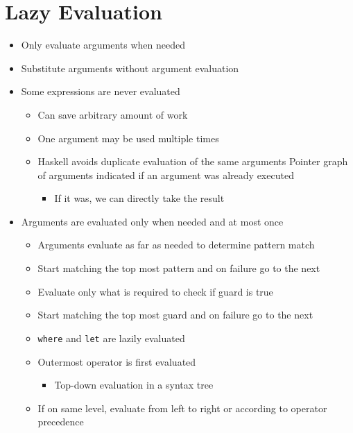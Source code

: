 
\section{Lazy Evaluation}
\begin{itemize}
    \item Only evaluate arguments when needed
    \item Substitute arguments without argument evaluation
    \item Some expressions are never evaluated
        \begin{itemize}
            \item Can save arbitrary amount of work
        \end{itemize}
        \begin{itemize}
            \item One argument may be used multiple times
            \item Haskell avoids duplicate evaluation of the same arguments
             Pointer graph of arguments indicated if an argument was already executed
                \begin{itemize}
                    \item If it was, we can directly take the result
                \end{itemize}
        \end{itemize}
    \item Arguments are evaluated only when needed and at most once
        \begin{itemize}
            \item Arguments evaluate as far as needed to determine pattern match
            \item Start matching the top most pattern and on failure go to the next
        \end{itemize}
        \begin{itemize}
            \item Evaluate only what is required to check if guard is true
            \item Start matching the top most guard and on failure go to the next
        \end{itemize}
        \begin{itemize}
            \item \verb+where+ and \verb+let+ are lazily evaluated
        \end{itemize}
        \begin{itemize}
            \item Outermost operator is first evaluated
                \begin{itemize}
                    \item Top-down evaluation in a syntax tree
                \end{itemize}
            \item If on same level, evaluate from left to right or according to operator precedence
        \end{itemize}
\end{itemize}

